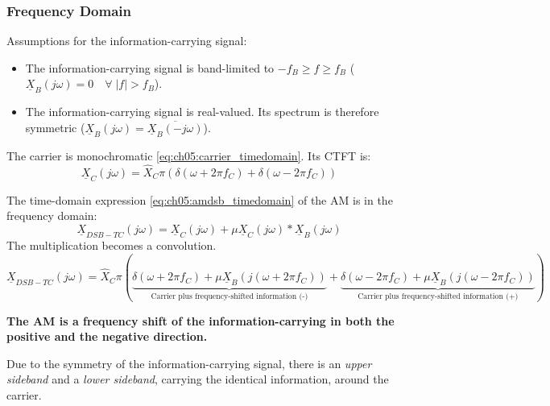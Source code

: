 \begin{refsection}
\subsubsection{Frequency Domain}

Assumptions for the information-carrying signal:
\begin{itemize}
	\item The information-carrying signal is band-limited to $-f_B \geq f \geq f_B$ ($\underline{X}_B\left(j\omega\right) = 0 \quad \forall \; |f| > f_B$).
	\item The information-carrying signal is real-valued. Its spectrum is therefore symmetric ($\underline{X}_B\left(j\omega\right) = \overline{\underline{X}_B\left(-j\omega\right)}$).
\end{itemize}

The carrier is monochromatic \eqref{eq:ch05:carrier_timedomain}. Its \ac{CTFT} is:
\begin{equation}
	\underline{X}_C\left(j\omega\right) = \hat{X}_C \pi \left( \delta\left(\omega + 2 \pi f_C \right) + \delta\left(\omega - 2 \pi f_C \right) \right)
\end{equation}

The time-domain expression \eqref{eq:ch05:amdsb_timedomain} of the \ac{AM} is in the frequency domain:
\begin{equation}
	\underline{X}_{DSB-TC}\left(j\omega\right) = \underline{X}_C\left(j\omega\right) + \mu \underline{X}_C\left(j\omega\right) * \underline{X}_B\left(j\omega\right)
\end{equation}
The multiplication becomes a convolution.
\begin{equation}
	\underline{X}_{DSB-TC}\left(j\omega\right) = \hat{X}_C \pi \left( \underbrace{\delta\left(\omega + 2 \pi f_C \right) + \mu \underline{X}_B\left(j\left(\omega + 2 \pi f_C\right)\right)}_{\text{Carrier plus frequency-shifted information (-)}} + \underbrace{\delta\left(\omega - 2 \pi f_C \right) + \mu \underline{X}_B\left(j\left(\omega - 2 \pi f_C\right)\right)}_{\text{Carrier plus frequency-shifted information (+)}} \right)
\end{equation}

\textbf{The \ac{AM} is a frequency shift of the information-carrying in both the positive and the negative direction.}

Due to the symmetry of the information-carrying signal, there is an \emph{upper sideband} and a \emph{lower sideband}, carrying the identical information, around the carrier.


\end{refsection}
